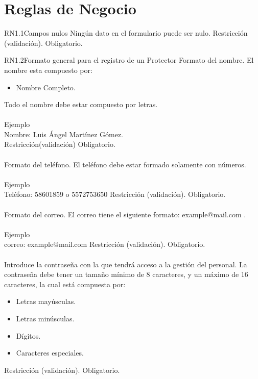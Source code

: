 \section{Reglas de Negocio}

\begin{BussinesRule}{RN1.1}{Campos nulos}
	\BRitem[Descripción:] Ningún dato en el formulario puede ser nulo.
	\BRitem[Tipo:] Restricción (validación).
	\BRitem[Nivel:] Obligatorio.
\end{BussinesRule}

\begin{BussinesRule}{RN1.2}{Formato general para el registro de un Protector}
	\BRitem[Nombre:] Formato del nombre.
	\BRitem[Descripción:] El nombre esta compuesto por:
		\begin{itemize}
			\item Nombre Completo.
		\end{itemize}
		Todo el nombre debe estar compuesto por letras.\\\\
	Ejemplo \\
	Nombre: Luis Ángel Martínez Gómez.\\
	\BRitem[Tipo:] Restricción(validación)
	\BRitem[Nivel:] Obligatorio.\\\\

	\BRitem[Teléfono:] Formato del teléfono.
	\BRitem[Descripción:] El teléfono debe estar formado solamente con números.\\\\
	Ejemplo \\
	Teléfono: 58601859 o 5572753650
	\BRitem[Tipo:] Restricción (validación).
	\BRitem[Nivel:] Obligatorio.\\\\

	\BRitem[Teléfono:] Formato del correo.
	\BRitem[Descripción:] El correo tiene el siguiente formato: example@mail.com .\\\\
	Ejemplo \\
	correo: example@mail.com
	\BRitem[Tipo:] Restricción (validación).
	\BRitem[Nivel:] Obligatorio.\\\\

	\BRitem[Contraseña:] Introduce la contraseña con la que tendrá acceso a la gestión del personal.
	\BRitem[Descripción:] La contraseña debe tener un tamaño mínimo de 8 caracteres, y un máximo de 16 caracteres, la cual está compuesta por:
		\begin{itemize}
			\item Letras mayúsculas.
			\item Letras minúsculas.
			\item Dígitos.
			\item Caracteres especiales.
		\end{itemize}
	\BRitem[Tipo:] Restricción (validación).
	\BRitem[Nivel:] Obligatorio.\\\\


\end{BussinesRule}
